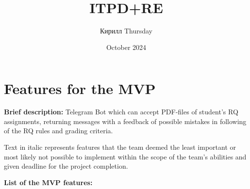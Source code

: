 \documentclass{article}
\title{ITPD+RE}
\author{Кирилл Thursday}
\date{October 2024}
\begin{document}
\section*{Features for the MVP}

\textbf{Brief description:} Telegram Bot which can accept PDF-files of student's RQ assignments, returning messages with a feedback of possible mistakes in following of the RQ rules and grading criteria.

Text in italic represents features that the team deemed the least important or most likely not possible to implement within the scope of the team's abilities and given deadline for the project completion.

\textbf{List of the MVP features:}
\end{document}
